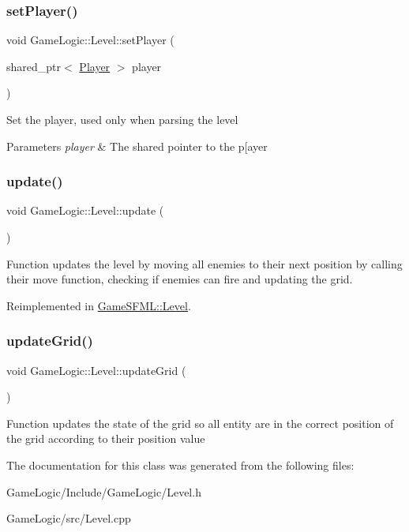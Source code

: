 \subsubsection{\texorpdfstring{set\+Player()}{setPlayer()}}
{\footnotesize\ttfamily void Game\+Logic\+::\+Level\+::set\+Player (\begin{DoxyParamCaption}\item[{shared\+\_\+ptr$<$ \hyperlink{classGameLogic_1_1Player}{Player} $>$}]{player }\end{DoxyParamCaption})}

Set the player, used only when parsing the level 
\begin{DoxyParams}{Parameters}
{\em player} & The shared pointer to the p\mbox{[}ayer \\
\hline
\end{DoxyParams}
\mbox{\label{classGameLogic_1_1Level_a72f5b36a0254821aabaaafa48834998b}} 
\subsubsection{\texorpdfstring{update()}{update()}}
{\footnotesize\ttfamily void Game\+Logic\+::\+Level\+::update (\begin{DoxyParamCaption}{ }\end{DoxyParamCaption})\hspace{0.3cm}{\ttfamily [virtual]}}

Function updates the level by moving all enemies to their next position by calling their move function, checking if enemies can fire and updating the grid. 

Reimplemented in \hyperlink{classGameSFML_1_1Level_ab98f7a9ceb040bef609c2c96990707ba}{Game\+S\+F\+M\+L\+::\+Level}.

\mbox{\label{classGameLogic_1_1Level_a0d3d5db9311e281b7161c4daff692249}} 
\subsubsection{\texorpdfstring{update\+Grid()}{updateGrid()}}
{\footnotesize\ttfamily void Game\+Logic\+::\+Level\+::update\+Grid (\begin{DoxyParamCaption}{ }\end{DoxyParamCaption})}

Function updates the state of the grid so all entity are in the correct position of the grid according to their position value 

The documentation for this class was generated from the following files\+:\begin{DoxyCompactItemize}
\item 
Game\+Logic/\+Include/\+Game\+Logic/Level.\+h\item 
Game\+Logic/src/Level.\+cpp\end{DoxyCompactItemize}
